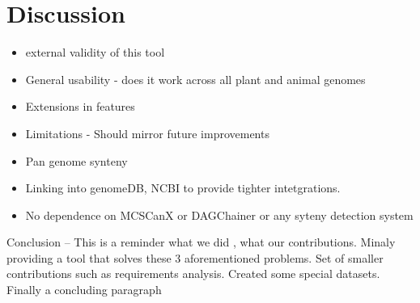 \chapter{Discussion}

\begin{itemize}
    \item external validity of this tool
    \item  General usability - does it work across all plant and animal genomes 
    \item Extensions in features
\end{itemize}

\begin{itemize}
    \item Limitations - Should mirror future improvements
    \item Pan genome synteny
    \item Linking into genomeDB, NCBI to provide tighter intetgrations.
    \item No dependence on MCSCanX or DAGChainer or any syteny detection system
\end{itemize}
 

Conclusion – This is a reminder what we did , what our contributions. Minaly providing a  tool that solves these 3 aforementioned problems. Set of smaller contributions such as requirements analysis. Created some special datasets. 
Finally a concluding paragraph 
